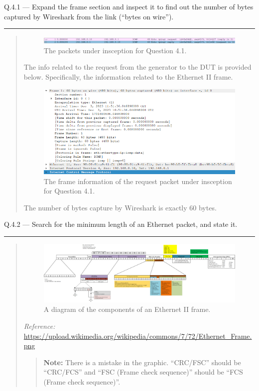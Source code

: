 \documentclass{article}
\newcommand\Que[2]{%
   \begin{samepage}
   \leavevmode\par
   \noindent
   Q.#1 --- #2\par\vspace{10pt}\hrule\vspace{10pt}
   \end{samepage}}
\newenvironment{ans}
   {\fbox{Answer}\begin{quote}}
   {\end{quote}}
\begin{document}
\Que{4.1}{Expand the frame section and inspect it to find out
the number of bytes captured by Wireshark from the link (``bytes
on wire'').}

\begin{ans}
\begin{figure}[H]
   \centering
   \includegraphics[width=16cm]{data/q4.1-packets-under-inspection.png}
   \caption{The packets under insception for Question 4.1.}
\end{figure}

The info related to the request from the generator to the DUT is
provided below. Specifically, the information related to the
Ethernet II frame.

\begin{figure}[H]
   \centering
   \includegraphics[width=16cm]{data/q4.1-request-info.png}
   \caption{The frame information of the request packet under
   insception for Question 4.1.}
\end{figure}

The number of bytes capture by Wireshark is exactly 60 bytes.
\end{ans}

\Que{4.2}{Search for the minimum length of an Ethernet packet,
and state it.}

\begin{ans}

\begin{figure}[H]
   \centering
   \includegraphics[width=16cm]{data/q4.2-ethernet-diagram.png}
   \caption{A diagram of the components of an Ethernet II frame.}
\end{figure}

{\small\textit{Reference:} \url{https://upload.wikimedia.org/wikipedia/commons/7/72/Ethernet_Frame.png}}

\begin{quote}
   \textbf{Note:} There is a mistake in the graphic. ``CRC/FSC''
   should be ``CRC/FCS'' and ``FSC (Frame check sequence)''
   should be ``FCS (Frame check sequence)''.
\end{quote}

\end{ans}
\end{document}
